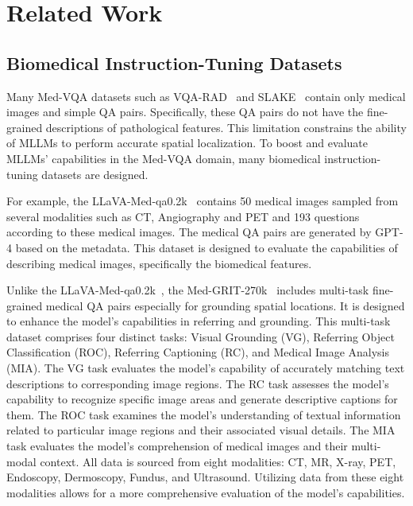 \section{Related Work}
\subsection{Biomedical Instruction-Tuning Datasets}
\label{dataset}
Many Med-VQA datasets such as VQA-RAD~\cite{lau2018dataset} and SLAKE~\cite{liu2021slake} contain only medical images and simple QA pairs. Specifically, these QA pairs do not have the fine-grained descriptions of pathological features. This limitation constrains the ability of MLLMs to perform accurate spatial localization. To boost and evaluate MLLMs' capabilities in the Med-VQA domain, many biomedical instruction-tuning datasets are designed.

For example, the LLaVA-Med-qa0.2k~\cite{zhang2025biomedclipmultimodalbiomedicalfoundation} contains 50 medical images sampled from several modalities such as CT, Angiography and PET and 193 questions according to these medical images. The medical QA pairs are generated by GPT-4 based on the metadata. This dataset is designed to evaluate the capabilities of describing medical images, specifically the biomedical features.

Unlike the LLaVA-Med-qa0.2k~\cite{zhang2025biomedclipmultimodalbiomedicalfoundation}, the Med-GRIT-270k~\cite{huang2024BiRD} includes multi-task fine-grained medical QA pairs especially for grounding spatial locations. It is designed to enhance the model's capabilities in referring and grounding. This multi-task dataset comprises four distinct tasks: Visual Grounding (VG), Referring Object Classification (ROC), Referring Captioning (RC), and Medical Image Analysis (MIA). The VG task evaluates the model's capability of accurately matching text descriptions to corresponding image regions. The RC task assesses the model's capability to recognize specific image areas and generate descriptive captions for them. The ROC task examines the model's understanding of textual information related to particular image regions and their associated visual details. The MIA task evaluates the model's comprehension of medical images and their multi-modal context. All data is sourced from eight modalities: CT, MR, X-ray, PET, Endoscopy, Dermoscopy, Fundus, and Ultrasound. Utilizing data from these eight modalities allows for a more comprehensive evaluation of the model's capabilities.
